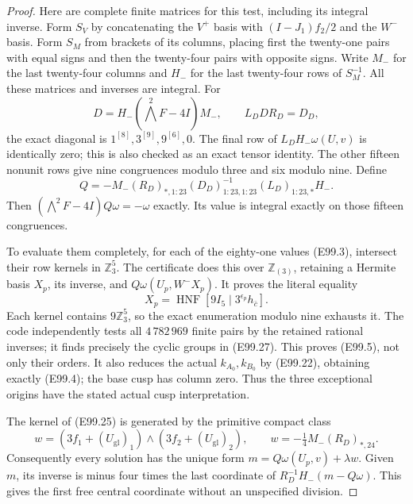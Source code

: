 \begin{proof}
Here are complete finite matrices for this test, including
its integral inverse. Form $S_V$ by concatenating the
$V^+$ basis with $(I-J_1)f_2/2$ and the $W^-$ basis.
Form $S_M$ from brackets of its columns, placing first
the twenty-one pairs with equal signs and then the
twenty-four pairs with opposite signs. Write
$M_-$ for the last twenty-four columns and $H_-$ for
the last twenty-four rows of $S_M^{-1}$.
All these matrices and inverses are integral.
For
\[
 D=H_-(\bigwedge^2F-4I)M_-,\qquad L_DDR_D=D_D,
 \tag{E99.25}
\]
the exact diagonal is
$1^{[8]},3^{[9]},9^{[6]},0$.
The final row of $L_DH_-\omega(U,v)$ is identically zero;
this is also checked as an exact tensor identity.
The other fifteen nonunit rows give nine congruences
modulo three and six modulo nine. Define
\[
 Q=-M_-(R_D)_{*,1:23}
       (D_D)_{1:23,1:23}^{-1}(L_D)_{1:23,*}H_-.
 \tag{E99.26}
\]
Then $(\bigwedge^2F-4I)Q\omega=-\omega$ exactly.
Its value is integral exactly on those fifteen congruences.

To evaluate them completely, for each of the eighty-one
values (E99.3), intersect their row kernels in
$\mathbb Z_3^5$. The certificate does this over
$\mathbb Z_{(3)}$, retaining a Hermite basis $X_p$, its
inverse, and $Q\omega(U_p,W^-X_p)$.
It proves the literal equality
\[
 X_p=\operatorname{HNF}
       \left[9I_5\mid3^{\epsilon_p}h_{\bar c}\right].
 \tag{E99.27}
\]
Each kernel contains $9\mathbb Z_3^5$, so the exact
enumeration modulo nine exhausts it. The code independently
tests all $4\,782\,969$ finite pairs by the retained
rational inverses; it finds precisely the cyclic groups
in (E99.27). This proves (E99.5), not only their orders.
It also reduces the actual $k_{A_0},k_{B_0}$ by
(E99.22), obtaining exactly (E99.4); the base cusp has
column zero. Thus the three exceptional origins have
the stated actual cusp interpretation.

The kernel of (E99.25) is generated by the primitive
compact class
\[
 w=(3f_1+(U_\mathrm{gl})_1)
              \wedge(3f_2+(U_\mathrm{gl})_2),
 \qquad
 w=-\tfrac14M_-(R_D)_{*,24}.
 \tag{E99.28}
\]
Consequently every solution has the unique form
$m=Q\omega(U_p,v)+\lambda w$.
Given $m$, its inverse is minus four times the last
coordinate of $R_D^{-1}H_-(m-Q\omega)$.
This gives the first free central coordinate without
an unspecified division.


\end{proof}
